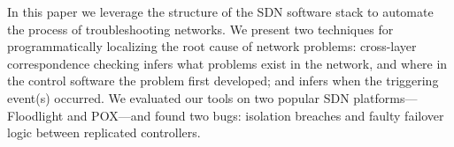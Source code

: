 In this paper we leverage the
structure of the SDN software stack to automate the process of troubleshooting
networks. We present two techniques for programmatically localizing the root cause of network problems:
cross-layer correspondence checking infers what problems exist in the network, 
and where in the control software the problem first developed; and
\simulator{} infers when the triggering event(s) occurred. We evaluated
our tools on
two popular SDN platforms---Floodlight and POX---and found two bugs:
isolation breaches and faulty failover logic between replicated controllers.
